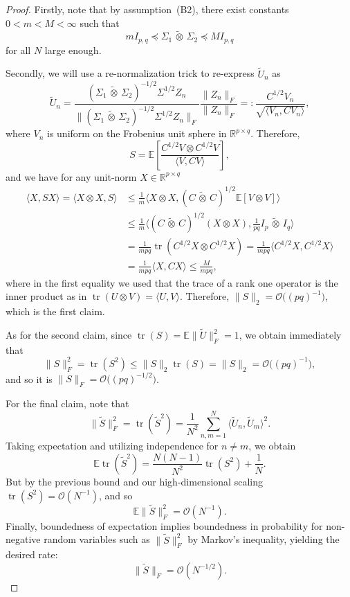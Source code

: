 \documentclass[10pt,a4paper]{amsart}
\newcommand{\E}{\mathbb{E}}
\newcommand{\R}{\mathbb{R}}
\newcommand{\ot}{\,\tilde\otimes\,}
\newcommand{\tr}{\operatorname{tr}}
\begin{document}
\begin{proof}
Firstly, note that by assumption~(B2), there exist constants \(0<m<M<\infty\) such that
\[
mI_{p,q}\preceq \Sigma_{1}\ot\Sigma_{2}\preceq M I_{p,q}
\]
for all $N$ large enough.

Secondly, we will use a re-normalization trick to re-express $\widetilde{U}_n$ as
\[
\widetilde{U}_n = \frac{(\Sigma_1 \ot \Sigma_2)^{-1/2} \Sigma^{1/2} Z_n}{\| (\Sigma_1 \ot \Sigma_2)^{-1/2} \Sigma^{1/2} Z_n\|_F} \frac{\|Z_n\|_F}{\|Z_n\|_F} =: \frac{C^{1/2} V_n}{\sqrt{\langle V_n, C V_n\rangle}}, 
\]
where $V_n$ is uniform on the Frobenius unit sphere in $\R^{p\times q}$. Therefore,
\[
S = \E\left[ \frac{C^{1/2}V \otimes C^{1/2}V}{\langle V, C V\rangle}\right],
\]
and we have for any unit-norm $X \in \R^{p \times q}$
\[
\begin{split}
\langle X, S X\rangle = \langle X \otimes X, S\rangle &\leq \frac{1}{m} \langle X \otimes X , (C \ot C)^{1/2} \E[V \otimes V] \rangle  \\
&\leq \frac{1}{m} \langle (C \ot C)^{1/2} (X \otimes X) ,  \frac{1}{pq} I_{p}\ot I_q \rangle\\
&= \frac{1}{mpq} \tr(C^{1/2}X \otimes C^{1/2}X) = \frac{1}{mpq} \langle C^{1/2}X, C^{1/2}X \rangle \\
&=\frac{1}{mpq} \langle X,CX \rangle \leq \frac{M}{mpq},
\end{split}
\]
where in the first equality we used that the trace of a rank one operator is the inner product as in $\tr(U \otimes V) = \langle U,V\rangle$.
Therefore, $\|S\|_{2} = \mathcal O\big( (pq)^{-1} \big)$, which is the first claim.

As for the second claim, since $\tr(S) = \E \|\widetilde{U}\|_F^2=1$, we obtain immediately that
\[
\|S\|_F^2=\tr(S^2)\le \|S\|_{2}\tr(S)=\|S\|_{2}=\mathcal O\big( (pq)^{-1} \big),
\]
and so it is $\|S\|_F = \mathcal O\big( (pq)^{-1/2} \big)$.

For the final claim, note that
\[
\| \widetilde S\|_F^2 = \tr(\widetilde S^2) = \frac{1}{N^2} \sum_{n,m=1}^N \langle \widetilde{U}_n,\widetilde{U}_m \rangle^2.
\]
Taking expectation and utilizing independence for $n \neq m$, we obtain
\[
\E \tr(\widetilde{S}^2) = \frac{N(N-1)}{N^2}\tr(S^2) + \frac{1}{N}.
\]
But by the previous bound and our high-dimensional scaling $\tr(S^2) = \mathcal{O}(N^{-1})$, and so
\[
\E \|\widetilde{S}\|_F^2 = \mathcal{O}(N^{-1}).
\]
Finally, boundedness of expectation implies boundedness in probability for non-negative random variables such as $\|\widetilde{S}\|_F^2$ by Markov's inequality, yielding the desired rate:
\[
\|\widetilde{S}\|_F = \mathcal{O}(N^{-1/2}).
\]
\end{proof}
\end{document}
